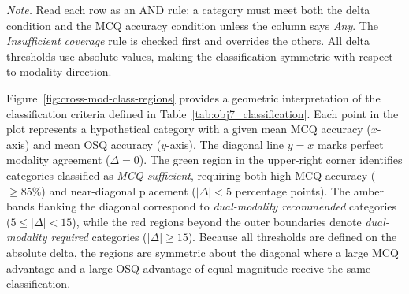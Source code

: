 \begin{table}[htbp]
\centering
\caption{Predefined category-level qualification modality classification criteria.}
\label{tab:obj7_classification}
\noindent\textit{Note.} Read each row as an AND rule: a category must meet both the delta condition and the MCQ accuracy condition unless the column says \emph{Any}. The \emph{Insufficient coverage} rule is checked first and overrides the others. All delta thresholds use absolute values, making the classification symmetric with respect to modality direction.
\end{table}


Figure~\ref{fig:cross-mod-class-regions} provides a geometric interpretation of the classification criteria defined in Table~\ref{tab:obj7_classification}. Each point in the plot represents a hypothetical category with a given mean MCQ accuracy ($x$-axis) and mean OSQ accuracy ($y$-axis). The diagonal line $y = x$ marks perfect modality agreement ($\Delta = 0$). The green region in the upper-right corner identifies categories classified as \emph{MCQ-sufficient}, requiring both high MCQ accuracy ($\geq 85\%$) and near-diagonal placement ($|\Delta| < 5$ percentage points). The amber bands flanking the diagonal correspond to \emph{dual-modality recommended} categories ($5 \leq |\Delta| < 15$), while the red regions beyond the outer boundaries denote \emph{dual-modality required} categories ($|\Delta| \geq 15$). Because all thresholds are defined on the absolute delta, the regions are symmetric about the diagonal where a large MCQ advantage and a large OSQ advantage of equal magnitude receive the same classification.


